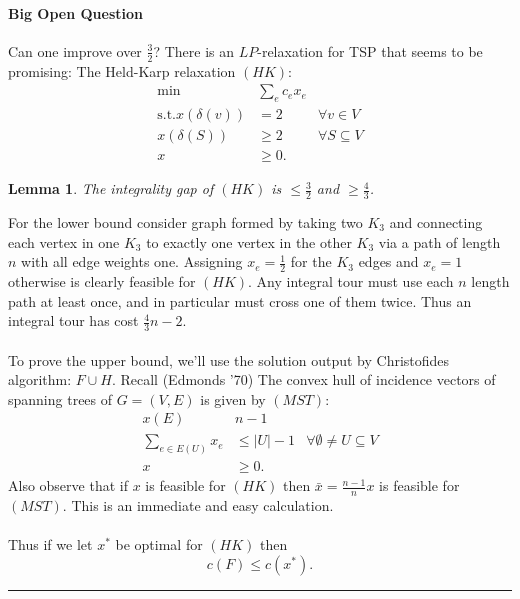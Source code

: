 \documentclass[letterpaper,12pt,oneside,onecolumn]{article}
\newenvironment{proof}{{\bf Proof:  }}{\hfill\rule{2mm}{2mm}}
\newtheorem{lemma}[fact]{Lemma}
\begin{document}
\paragraph{Big Open Question}
Can one improve over $\frac{3}{2}$? There is an $LP$-relaxation for TSP that seems to be promising: The Held-Karp relaxation $(HK)$:
\begin{align*}
\min &\sum_e c_e x_e \\
\text{s.t.} x(\delta(v)) &= 2 &\forall v \in V \\
x(\delta(S)) &\geq 2 &\forall S\subseteq V \\
x&\geq 0.
\end{align*}
\begin{lemma}
The integrality gap of $(HK)$ is $\leq \frac{3}{2}$ and $\geq \frac{4}{3}$.
\end{lemma}
\begin{proof}
For the lower bound consider graph formed by taking two $K_3$ and connecting each vertex in one $K_3$ to exactly one vertex in the other $K_3$ via a path of length $n$ with all edge weights one. Assigning $x_e = \frac{1}{2}$ for the $K_3$ edges and $x_e = 1$ otherwise is clearly feasible for $(HK)$. Any integral tour must use each $n$ length path at least once, and in particular must cross one of them twice. Thus an integral tour has cost $\frac{4}{3}n-2$.
\paragraph{}
To prove the upper bound, we'll use the solution output by Christofides algorithm: $F \cup H$. Recall (Edmonds '70) The convex hull of incidence vectors of spanning trees of $G = (V,E)$ is given by $(MST):$
\begin{align*}
x(E) &n-1 \\
\sum_{e \in E(U)} x_e &\leq |U| - 1 &\forall \emptyset\neq U \subseteq V\\
x&\geq 0.
\end{align*}
Also observe that if $x$ is feasible for $(HK)$ then $\bar{x} = \frac{n-1}{n}x$ is feasible for $(MST)$. This is an immediate and easy calculation.
\paragraph{}
Thus if we let $x^*$ be optimal for $(HK)$ then $$c(F) \leq c(x^*).$$

\end{proof}
\end{document}
